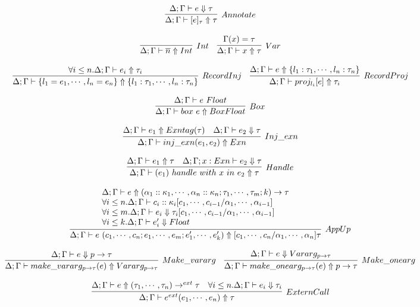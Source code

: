 \documentclass{article}
\begin{document}
$$
\infer[Annotate]{\Delta; \Gamma \vdash \Typed{e}{\tau} \Uparrow \tau}
{
	\Delta; \Gamma \vdash e \Downarrow \tau
}
$$

$$
\infer[Int]{\Delta; \Gamma \vdash \overline n \Uparrow \TInt}
{
}
\quad
\infer[Var]{\Delta; \Gamma \vdash x \Uparrow \tau}
{
	\Gamma(x) = \tau
}
$$

$$
\infer[RecordInj]{\Delta; \Gamma \vdash \RecordIntro{l_1 = e_1,\cdots,l_n = e_n} \Uparrow \Record{l_1: \tau_1,\cdots,l_n: \tau_n}}
{
	\forall i \leq n . \Delta; \Gamma \vdash e_i \Uparrow \tau_i
}
\quad
\infer[RecordProj]{\Delta; \Gamma \vdash \Proj{l_i}{e} \Uparrow \tau_i}
{
	\Delta; \Gamma \vdash e \Uparrow \Record{l_1: \tau_1,\cdots,l_n: \tau_n}
}
$$

$$
\infer[Box]{\Delta; \Gamma \vdash \Boxf{e} \Uparrow \BoxedFloat}
{
	\Delta; \Gamma \vdash e\ \Float
}
$$

$$
\infer[Inj\_exn]{\Delta; \Gamma \vdash \Injexn{e_1}{e_2} \Uparrow \Exn}
{
	\Delta; \Gamma \vdash e_1 \Uparrow \Exntag{\tau}
	\quad \Delta; \Gamma \vdash e_2 \Downarrow \tau
}
$$

$$
\infer[Handle]{\Delta; \Gamma \vdash \Handle{e_1}{x}{e_2} \Uparrow \tau}
{
	\Delta; \Gamma \vdash e_1 \Uparrow \tau
	\quad \Delta; \Gamma; x: \Exn \vdash e_2 \Downarrow \tau
}
$$

$$
\infer[AppUp]{\Delta; \Gamma \vdash \App{e}{c_1,\cdots,c_n}{e_1,\cdots,e_m}{e'_1,\cdots,e'_k} \Uparrow [c_1,\cdots,c_n/\alpha_1,\cdots,\alpha_n]\tau}
{
	\begin{array}{l}
		\Delta; \Gamma \vdash e \Uparrow \Arrow{\alpha_1::\kappa_1,\cdots,\alpha_n::\kappa_n}{\tau_1,\cdots,\tau_m}{k}{\tau} \\
		\forall i \leq n . \Delta; \Gamma \vdash c_i :: \kappa_i[c_1,\cdots,c_{i-1}/\alpha_1,\cdots,\alpha_{i-1}] \\
		\forall i \leq m . \Delta; \Gamma \vdash e_i \Downarrow \tau_i[c_1,\cdots,c_{i-1}/\alpha_1,\cdots,\alpha_{i-1}] \\
		\forall i \leq k . \Delta; \Gamma \vdash e'_i \Downarrow \Float
	\end{array}
}
$$

$$
\infer[Make\_vararg]{\Delta; \Gamma \vdash \Mkvararg{\PArrow{p}{\tau}}{e} \Uparrow \Vararg{p}{\tau}}
{
	\Delta; \Gamma \vdash e \Downarrow \PArrow{p}{\tau}
}
\quad
\infer[Make\_onearg]{\Delta; \Gamma \vdash \Mkonearg{\PArrow{p}{\tau}}{e} \Uparrow \PArrow{p}{\tau}}
{
	\Delta; \Gamma \vdash e \Downarrow \Vararg{p}{\tau}
}
$$

$$
\infer[ExternCall]{\Delta; \Gamma \vdash \ExternApp{e}{e_1,\cdots,e_n} \Uparrow \tau}
{
	\Delta; \Gamma \vdash e \Uparrow \ExternArrow{\tau_1,\cdots,\tau_n}{\tau}
	\quad \forall i \leq n . \Delta; \Gamma \vdash e_i \Downarrow \tau_i
}
$$
\end{document}
